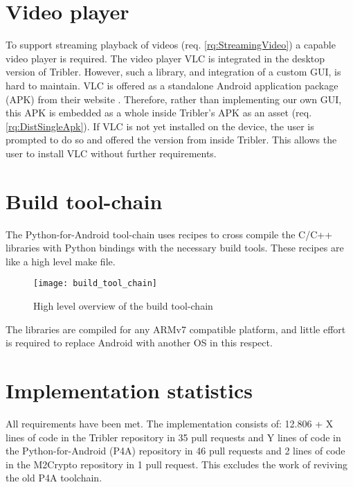 \section{Video player}
To support streaming playback of videos (req. \ref{rq:StreamingVideo}) a capable video player is required.
The video player VLC is integrated in the desktop version of Tribler.
However, such a library, and integration of a custom GUI, is hard to maintain.
VLC is offered as a standalone Android application package (APK) from their website \cite{vlc-apk}.
Therefore, rather than implementing our own GUI, this APK is embedded as a whole inside Tribler's APK as an asset (req. \ref{rq:DistSingleApk}).
If VLC is not yet installed on the device, the user is prompted to do so and offered the version from inside Tribler.
This allows the user to install VLC without further requirements.


\section{Build tool-chain}\label{sec:build_toolchain}

The Python-for-Android tool-chain uses recipes to cross compile the C/C++ libraries with Python bindings with the necessary build tools.
These recipes are like a high level make file.

\begin{figure}[H]
	\centering
	\texttt{[image: build\_tool\_chain]}
	\caption{High level overview of the build tool-chain}
	\label{fig:build_tool_chain}
\end{figure}

The libraries are compiled for any ARMv7 compatible platform, and little effort is required to replace Android with another OS in this respect.



\section{Implementation statistics}\label{sec:impl_stats}
All requirements have been met.
The implementation consists of:
12.806 + X lines of code in the Tribler repository in 35 pull requests and
Y lines of code in the Python-for-Android (P4A) repository in 46 pull requests and
2 lines of code in the M2Crypto repository in 1 pull request.
This excludes the work of reviving the old P4A toolchain.

